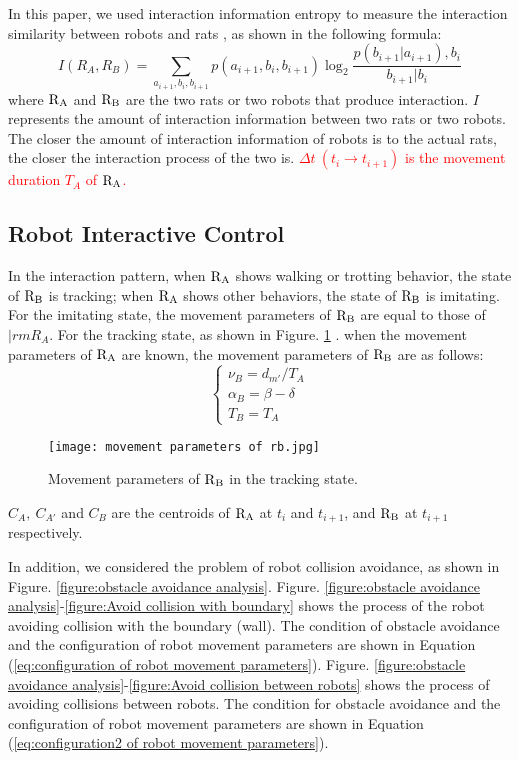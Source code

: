 In this paper, we used interaction information entropy to measure the
interaction similarity between robots and rats \cite{lellis-feedback-control},
as shown in the following formula:
\begin{equation} \label{eq:interaction similarity}
    I(R_A,R_B)=\sum_{a_{i+1},b_i,b_{i+1}}p(a_{i+1},b_i,b_{i+1})\log_{2}
    \frac{p(b_{i+1}|a_{i+1}),b_{i}}{b_{i+1}|b_i}
\end{equation}
where $\rm R_A$ and $\rm R_B$ are the two rats or two robots that produce
interaction. $I$ represents the amount of interaction information between two
rats or two robots. The closer the amount of interaction information of robots
is to the actual rats, the closer the interaction process of the two is.
\textcolor{red}{$\Delta t~(t_i\rightarrow t_{i+1})$ is the movement duration
$T_A$ of $\rm R_A$.}

\subsection{Robot Interactive Control}
In the interaction pattern, when $\rm R_A$ shows walking or trotting behavior,
the state of $\rm R_B$ is tracking; when $\rm R_A$ shows other behaviors, the
state of $\rm R_B$ is imitating. For the imitating state, the movement
parameters of $\rm R_B$ are equal to those of $|rm R_A$. For the tracking state,
as shown in Figure. \ref{figure:movement parameters of RB in the tracking state}
. when the movement parameters of $\rm R_A$ are known, the movement parameters
of $\rm R_B$ are as follows:
\begin{equation} \label{eq:movement parameters}
    \begin{cases}
        \nu_B=d_{m'}/T_A \\
        \alpha_B=\beta - \delta \\
        T_B=T_A
    \end{cases}
\end{equation}
\begin{figure}[h]
    \centering
    \texttt{[image: movement parameters of rb.jpg]}
    \caption{Movement parameters of $\rm R_B$ in the tracking state.}
    \label{figure:movement parameters of RB in the tracking state}
\end{figure}
$C_A,~C_{A'}$ and $C_B$ are the centroids of $\rm R_A$ at $t_i$ and $t_{i+1}$,
and $\rm R_B$ at $t_{i+1}$ respectively.

In addition, we considered the problem of robot collision avoidance, as shown in
Figure. \ref{figure:obstacle avoidance analysis}. Figure. \ref{figure:obstacle
avoidance analysis}-\ref{figure:Avoid collision with boundary} shows the process
of the robot avoiding collision with the boundary (wall). The condition of
obstacle avoidance and the configuration of robot movement parameters are shown
in Equation (\ref{eq:configuration of robot movement parameters}). Figure.
\ref{figure:obstacle avoidance analysis}-\ref{figure:Avoid collision between
robots} shows the process of avoiding collisions between robots. The condition
for obstacle avoidance and the configuration of robot movement parameters are
shown in Equation (\ref{eq:configuration2 of robot movement parameters}).

